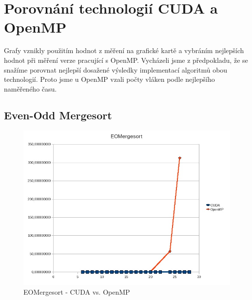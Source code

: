 \documentclass[12pt]{article}
\begin{document}
\section{Porovnání technologií CUDA a OpenMP}
Grafy vznikly použitím hodnot z měření na grafické kartě a vybráním nejlepších hodnot při měření verze pracující s OpenMP.
Vycházeli jsme z předpokladu, že se snažíme porovnat nejlepší dosažené výsledky implementací algoritmů obou technologií. Proto jsme
u OpenMP vzali počty vláken podle nejlepšího naměřeného času.
\subsection{Even-Odd Mergesort}
\begin{figure}[H]
\begin{center}
\includegraphics[width=14cm]{eom-cudavsomp.jpg}
\caption{EOMergesort - CUDA vs. OpenMP}
\label{fig:eom-cuda-vs-omp}
\end{center}
\end{figure}
\end{document}
